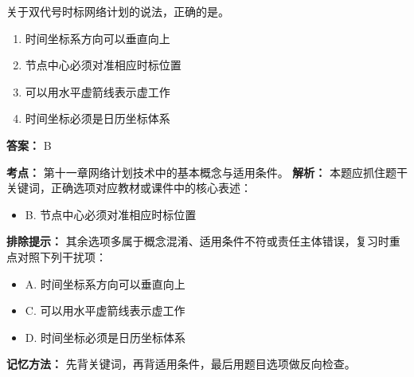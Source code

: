 \documentclass[UTF8,fontset=fandol,11pt]{ctexart}
\begin{document}
\begin{quizbox}[title={第 10 题}]
关于双代号时标网络计划的说法，正确的是。\\
\begin{enumerate}[label=\Alph*.]
\item 时间坐标系方向可以垂直向上
\item 节点中心必须对准相应时标位置
\item 可以用水平虚箭线表示虚工作
\item 时间坐标必须是日历坐标体系
\end{enumerate}
\textbf{答案：} B
\vspace{0.25em}
\begin{answerbox}[title={考点解析}]
\textbf{考点：} 第十一章网络计划技术中的基本概念与适用条件。
\textbf{解析：} 本题应抓住题干关键词，正确选项对应教材或课件中的核心表述：
\begin{itemize}
\item B. 节点中心必须对准相应时标位置
\end{itemize}
\textbf{排除提示：} 其余选项多属于概念混淆、适用条件不符或责任主体错误，复习时重点对照下列干扰项：
\begin{itemize}
\item A. 时间坐标系方向可以垂直向上
\item C. 可以用水平虚箭线表示虚工作
\item D. 时间坐标必须是日历坐标体系
\end{itemize}
\textbf{记忆方法：} 先背关键词，再背适用条件，最后用题目选项做反向检查。
\end{answerbox}
\end{quizbox}

\vspace{0.2em}
\end{document}
